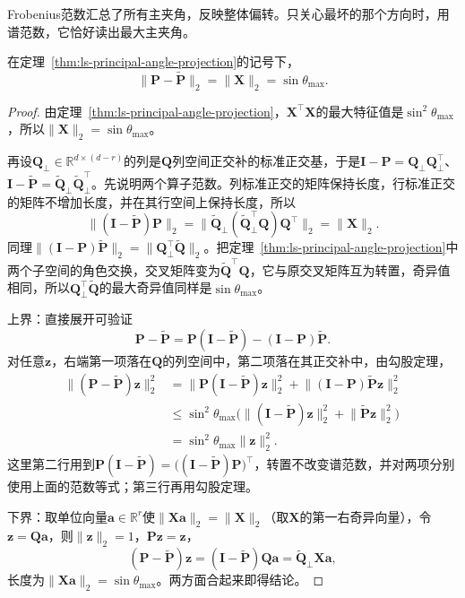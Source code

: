 Frobenius范数汇总了所有主夹角，反映整体偏转。只关心最坏的那个方向时，用谱范数，它恰好读出最大主夹角。
\begin{theorem}[投影之差的谱范数]
\label{thm:ls-projection-spectral-distance}
在定理~\ref{thm:ls-principal-angle-projection}的记号下，
\[
 \lVert\bm P-\widetilde{\bm P}\rVert_2=\lVert\bm X\rVert_2=\sin\theta_{\max}.
\]
\end{theorem}
\begin{proof}
由定理~\ref{thm:ls-principal-angle-projection}，$\bm X^\top\bm X$的最大特征值是$\sin^2\theta_{\max}$，所以$\lVert\bm X\rVert_2=\sin\theta_{\max}$。

再设$\bm Q_\perp\in\mathbb R^{d\times(d-r)}$的列是$\bm Q$列空间正交补的标准正交基，于是$\bm I-\bm P=\bm Q_\perp\bm Q_\perp^\top$、$\bm I-\widetilde{\bm P}=\widetilde{\bm Q}_\perp\widetilde{\bm Q}_\perp^\top$。先说明两个算子范数。列标准正交的矩阵保持长度，行标准正交的矩阵不增加长度，并在其行空间上保持长度，所以
\[
 \lVert(\bm I-\widetilde{\bm P})\bm P\rVert_2
 =\lVert\widetilde{\bm Q}_\perp(\widetilde{\bm Q}_\perp^\top\bm Q)\bm Q^\top\rVert_2
 =\lVert\bm X\rVert_2 .
\]
同理$\lVert(\bm I-\bm P)\widetilde{\bm P}\rVert_2=\lVert\bm Q_\perp^\top\widetilde{\bm Q}\rVert_2$。把定理~\ref{thm:ls-principal-angle-projection}中两个子空间的角色交换，交叉矩阵变为$\widetilde{\bm Q}^\top\bm Q$，它与原交叉矩阵互为转置，奇异值相同，所以$\bm Q_\perp^\top\widetilde{\bm Q}$的最大奇异值同样是$\sin\theta_{\max}$。

上界：直接展开可验证
\[
 \bm P-\widetilde{\bm P}=\bm P(\bm I-\widetilde{\bm P})-(\bm I-\bm P)\widetilde{\bm P}.
\]
对任意$\bm z$，右端第一项落在$\bm Q$的列空间中，第二项落在其正交补中，由勾股定理，
\[
 \begin{aligned}
 \lVert(\bm P-\widetilde{\bm P})\bm z\rVert_2^2
 &=\lVert\bm P(\bm I-\widetilde{\bm P})\bm z\rVert_2^2+\lVert(\bm I-\bm P)\widetilde{\bm P}\bm z\rVert_2^2\\
 &\leq\sin^2\theta_{\max}\bigl(\lVert(\bm I-\widetilde{\bm P})\bm z\rVert_2^2+\lVert\widetilde{\bm P}\bm z\rVert_2^2\bigr)\\
 &=\sin^2\theta_{\max}\lVert\bm z\rVert_2^2 .
 \end{aligned}
\]
这里第二行用到$\bm P(\bm I-\widetilde{\bm P})=\bigl((\bm I-\widetilde{\bm P})\bm P\bigr)^\top$，转置不改变谱范数，并对两项分别使用上面的范数等式；第三行再用勾股定理。

下界：取单位向量$\bm a\in\mathbb R^r$使$\lVert\bm X\bm a\rVert_2=\lVert\bm X\rVert_2$（取$\bm X$的第一右奇异向量），令$\bm z=\bm Q\bm a$，则$\lVert\bm z\rVert_2=1$，$\bm P\bm z=\bm z$，
\[
 (\bm P-\widetilde{\bm P})\bm z=(\bm I-\widetilde{\bm P})\bm Q\bm a=\widetilde{\bm Q}_\perp\bm X\bm a ,
\]
长度为$\lVert\bm X\bm a\rVert_2=\sin\theta_{\max}$。两方面合起来即得结论。
\end{proof}

